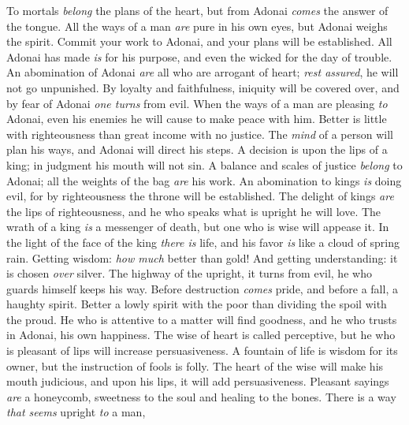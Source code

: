 \begin{biblechapter} %
\verse To mortals \textit{belong} the plans of the heart, 
but from Adonai \textit{comes} the answer of the tongue.
\verse All the ways of a man \textit{are} pure in his own eyes, 
but Adonai weighs the spirit.
\verse Commit your work to Adonai, 
and your plans will be established.
\verse All Adonai has made \textit{is} for his purpose, 
and even the wicked for the day of trouble.
\verse An abomination of Adonai \textit{are} all who are arrogant of heart; 
\textit{rest assured}, he will not go unpunished.
\verse By loyalty and faithfulness, iniquity will be covered over, 
and by fear of Adonai \textit{one turns} from evil.
\verse When the ways of a man are pleasing \textit{to} Adonai, 
even his enemies he will cause to make peace with him.
\verse Better is little with righteousness 
than great income with no justice.
\verse The \textit{mind} of a person will plan his ways, 
and Adonai will direct his steps.
\verse A decision is upon the lips of a king; 
in judgment his mouth will not sin.
\verse A balance and scales of justice \textit{belong} to Adonai; 
all the weights of the bag \textit{are} his work.
\verse An abomination to kings \textit{is} doing evil, 
for by righteousness the throne will be established.
\verse The delight of kings \textit{are} the lips of righteousness, 
and he who speaks what is upright he will love.
\verse The wrath of a king \textit{is} a messenger of death, 
but one who is wise will appease it.
\verse In the light of the face of the king \textit{there is} life, 
and his favor \textit{is} like a cloud of spring rain.
\verse Getting wisdom: \textit{how much} better than gold! 
And getting understanding: it is chosen \textit{over} silver.
\verse The highway of the upright, it turns from evil, 
he who guards himself keeps his way.
\verse Before destruction \textit{comes} pride, 
and before a fall, a haughty spirit.
\verse Better a lowly spirit with the poor 
than dividing the spoil with the proud.
\verse He who is attentive to a matter will find goodness, 
and he who trusts in Adonai, his own happiness.
\verse The wise of heart is called perceptive, 
but he who is pleasant of lips will increase persuasiveness.
\verse A fountain of life is wisdom for its owner, 
but the instruction of fools is folly.
\verse The heart of the wise will make his mouth judicious, 
and upon his lips, it will add persuasiveness.
\verse Pleasant sayings \textit{are} a honeycomb, 
sweetness to the soul and healing to the bones.
\verse There is a way \textit{that seems} upright \textit{to} a man, 

\end{biblechapter}
